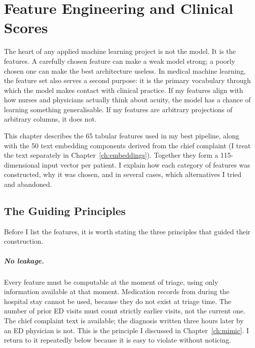 
\chapter{Feature Engineering and Clinical Scores}
\label{ch:features}

The heart of any applied machine learning project is not the model. It is the features. A carefully chosen feature can make a weak model strong; a poorly chosen one can make the best architecture useless. In medical machine learning, the feature set also serves a second purpose: it is the primary vocabulary through which the model makes contact with clinical practice. If my features align with how nurses and physicians actually think about acuity, the model has a chance of learning something generalisable. If my features are arbitrary projections of arbitrary columns, it does not.

This chapter describes the 65 tabular features used in my best pipeline, along with the 50 text embedding components derived from the chief complaint (I treat the text separately in Chapter~\ref{ch:embeddings}). Together they form a 115-dimensional input vector per patient. I explain how each category of features was constructed, why it was chosen, and in several cases, which alternatives I tried and abandoned.

\section{The Guiding Principles}

Before I list the features, it is worth stating the three principles that guided their construction.

\paragraph{No leakage.} Every feature must be computable at the moment of triage, using only information available at that moment. Medication records from during the hospital stay cannot be used, because they do not exist at triage time. The number of prior ED visits must count strictly earlier visits, not the current one. The chief complaint text is available; the diagnosis written three hours later by an ED physician is not. This is the principle I discussed in Chapter~\ref{ch:mimic}. I return to it repeatedly below because it is easy to violate without noticing.

